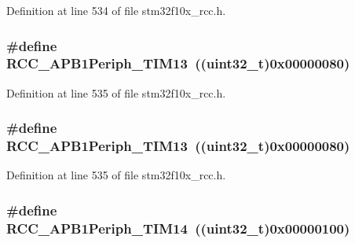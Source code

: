 Definition at line 534 of file stm32f10x\+\_\+rcc.\+h.

\subsubsection[{\texorpdfstring{R\+C\+C\+\_\+\+A\+P\+B1\+Periph\+\_\+\+T\+I\+M13}{RCC_APB1Periph_TIM13}}]{\setlength{\rightskip}{0pt plus 5cm}\#define R\+C\+C\+\_\+\+A\+P\+B1\+Periph\+\_\+\+T\+I\+M13~(({\bf uint32\+\_\+t})0x00000080)}\hypertarget{group___a_p_b1__peripheral_ga34397b722f46f31e898136fb51a7523a}{}\label{group___a_p_b1__peripheral_ga34397b722f46f31e898136fb51a7523a}


Definition at line 535 of file stm32f10x\+\_\+rcc.\+h.

\subsubsection[{\texorpdfstring{R\+C\+C\+\_\+\+A\+P\+B1\+Periph\+\_\+\+T\+I\+M13}{RCC_APB1Periph_TIM13}}]{\setlength{\rightskip}{0pt plus 5cm}\#define R\+C\+C\+\_\+\+A\+P\+B1\+Periph\+\_\+\+T\+I\+M13~(({\bf uint32\+\_\+t})0x00000080)}\hypertarget{group___a_p_b1__peripheral_ga34397b722f46f31e898136fb51a7523a}{}\label{group___a_p_b1__peripheral_ga34397b722f46f31e898136fb51a7523a}


Definition at line 535 of file stm32f10x\+\_\+rcc.\+h.

\subsubsection[{\texorpdfstring{R\+C\+C\+\_\+\+A\+P\+B1\+Periph\+\_\+\+T\+I\+M14}{RCC_APB1Periph_TIM14}}]{\setlength{\rightskip}{0pt plus 5cm}\#define R\+C\+C\+\_\+\+A\+P\+B1\+Periph\+\_\+\+T\+I\+M14~(({\bf uint32\+\_\+t})0x00000100)}\hypertarget{group___a_p_b1__peripheral_ga7100c45768eea1484f6fd519b53e287d}{}\label{group___a_p_b1__peripheral_ga7100c45768eea1484f6fd519b53e287d}


